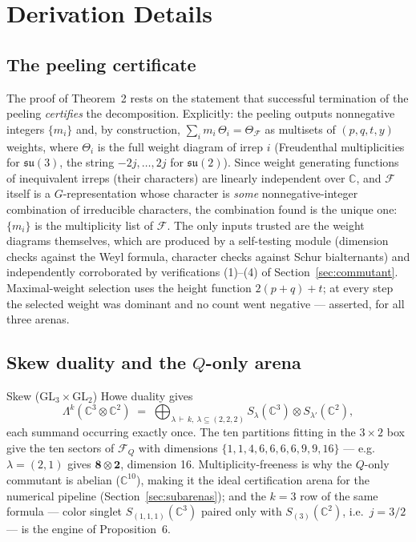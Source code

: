 \documentclass[11pt]{article}
\newcommand{\CC}{\mathbb{C}}
\newcommand{\Fock}{\mathcal{F}}
\newcommand{\su}[1]{\mathfrak{su}(#1)}
\begin{document}
\appendix

\section{Derivation Details}

\subsection{The peeling certificate}\label{app:peel}

The proof of Theorem~2 rests on the statement that successful termination of the peeling \emph{certifies} the decomposition. Explicitly: the peeling outputs nonnegative integers $\{m_i\}$ and, by construction, $\sum_i m_i\,\Theta_i = \Theta_\Fock$ as multisets of $(p,q,t,y)$ weights, where $\Theta_i$ is the full weight diagram of irrep $i$ (Freudenthal multiplicities for $\su3$, the string $-2j,\ldots,2j$ for $\su2$). Since weight generating functions of inequivalent irreps (their characters) are linearly independent over $\CC$, and $\Fock$ itself is a $G$-representation whose character is \emph{some} nonnegative-integer combination of irreducible characters, the combination found is the unique one: $\{m_i\}$ is the multiplicity list of $\Fock$. The only inputs trusted are the weight diagrams themselves, which are produced by a self-testing module (dimension checks against the Weyl formula, character checks against Schur bialternants) and independently corroborated by verifications (1)--(4) of Section~\ref{sec:commutant}. Maximal-weight selection uses the height function $2(p+q)+t$; at every step the selected weight was dominant and no count went negative --- asserted, for all three arenas.

\subsection{Skew duality and the \texorpdfstring{$Q$}{Q}-only arena}\label{app:skew}

Skew (GL$_3\times$GL$_2$) Howe duality gives
\begin{equation*}
\Lambda^k(\CC^3\otimes\CC^2) \;=\; \bigoplus_{\lambda\,\vdash\, k,\ \lambda\subseteq(2,2,2)} S_\lambda(\CC^3)\otimes S_{\lambda'}(\CC^2),
\end{equation*}
each summand occurring exactly once. The ten partitions fitting in the $3\times2$ box give the ten sectors of $\Fock_Q$ with dimensions $\{1,1,4,6,6,6,6,9,9,16\}$ --- e.g.\ $\lambda = (2,1)$ gives $\mathbf{8}\otimes\mathbf{2}$, dimension 16. Multiplicity-freeness is why the $Q$-only commutant is abelian ($\CC^{10}$), making it the ideal certification arena for the numerical pipeline (Section~\ref{sec:subarenas}); and the $k=3$ row of the same formula --- color singlet $S_{(1,1,1)}(\CC^3)$ paired only with $S_{(3)}(\CC^2)$, i.e.\ $j = 3/2$ --- is the engine of Proposition~6.
\end{document}
